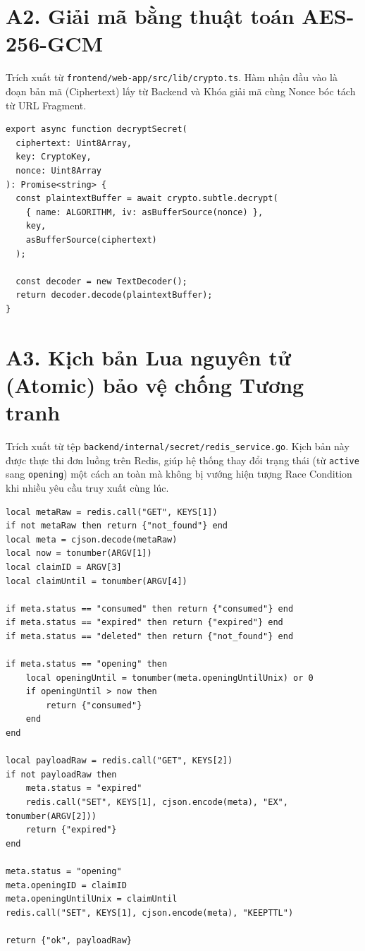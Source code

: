 \section*{A2. Giải mã bằng thuật toán AES-256-GCM}

Trích xuất từ \texttt{frontend/web-app/src/lib/crypto.ts}. Hàm nhận đầu vào là đoạn bản mã (Ciphertext) lấy từ Backend và Khóa giải mã cùng Nonce bóc tách từ URL Fragment.

\begin{verbatim}
export async function decryptSecret(
  ciphertext: Uint8Array,
  key: CryptoKey,
  nonce: Uint8Array
): Promise<string> {
  const plaintextBuffer = await crypto.subtle.decrypt(
    { name: ALGORITHM, iv: asBufferSource(nonce) },
    key,
    asBufferSource(ciphertext)
  );

  const decoder = new TextDecoder();
  return decoder.decode(plaintextBuffer);
}
\end{verbatim}

\section*{A3. Kịch bản Lua nguyên tử (Atomic) bảo vệ chống Tương tranh}

Trích xuất từ tệp \texttt{backend/internal/secret/redis\_service.go}. Kịch bản này được thực thi đơn luồng trên Redis, giúp hệ thống thay đổi trạng thái (từ \texttt{active} sang \texttt{opening}) một cách an toàn mà không bị vướng hiện tượng Race Condition khi nhiều yêu cầu truy xuất cùng lúc.

\begin{verbatim}
local metaRaw = redis.call("GET", KEYS[1])
if not metaRaw then return {"not_found"} end
local meta = cjson.decode(metaRaw)
local now = tonumber(ARGV[1])
local claimID = ARGV[3]
local claimUntil = tonumber(ARGV[4])

if meta.status == "consumed" then return {"consumed"} end
if meta.status == "expired" then return {"expired"} end
if meta.status == "deleted" then return {"not_found"} end

if meta.status == "opening" then
	local openingUntil = tonumber(meta.openingUntilUnix) or 0
	if openingUntil > now then
		return {"consumed"}
	end
end

local payloadRaw = redis.call("GET", KEYS[2])
if not payloadRaw then
	meta.status = "expired"
	redis.call("SET", KEYS[1], cjson.encode(meta), "EX", tonumber(ARGV[2]))
	return {"expired"}
end

meta.status = "opening"
meta.openingID = claimID
meta.openingUntilUnix = claimUntil
redis.call("SET", KEYS[1], cjson.encode(meta), "KEEPTTL")

return {"ok", payloadRaw}
\end{verbatim}